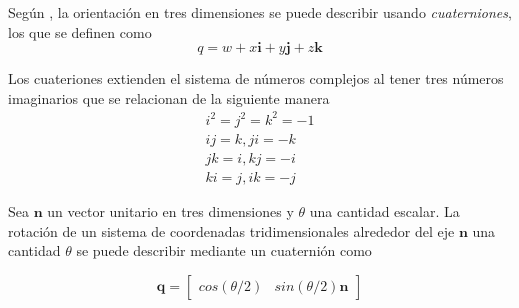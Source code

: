Según \cite{dunn20023d}, la orientación en tres dimensiones se puede describir usando \emph{cuaterniones}, los que se definen como
\begin{equation}
  q = w + x\mathbf{i} + y\mathbf{j} + z\mathbf{k}
\end{equation}

Los cuateriones extienden el sistema de números complejos al tener tres números imaginarios que se relacionan de la siguiente manera
\begin{gather}
  i^2 = j^2 = k^2 = -1 \\
  ij = k, ji = -k \nonumber \\
  jk = i, kj = -i \nonumber \\
  ki = j, ik = -j \nonumber
\end{gather}

Sea $ \mathbf{n} $ un vector unitario en tres dimensiones y $ \theta $ una cantidad escalar. La rotación de un sistema de coordenadas tridimensionales alrededor  del eje $ \mathbf{n} $ una cantidad $ \theta $ se puede describir mediante un cuaternión como

\begin{equation}
  \mathbf{q} =
  \begin{bmatrix}
    cos(\theta/2) & sin(\theta/2) \mathbf{n}
  \end{bmatrix}
\end{equation}